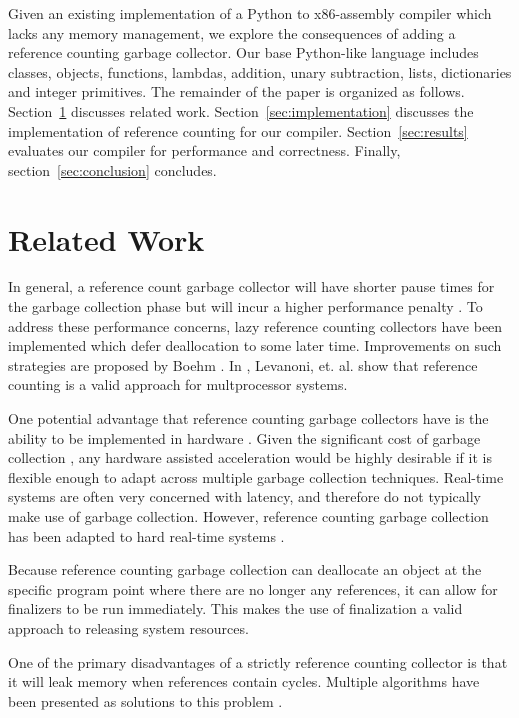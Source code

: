 \documentclass{sigplanconf}
\begin{document}
Given an existing implementation of a Python to x86-assembly compiler which lacks any memory management, we explore the consequences of adding a reference counting garbage collector.  Our base Python-like language includes classes, objects, functions, lambdas, addition, unary subtraction, lists, dictionaries and integer primitives.  The remainder of the paper is organized as follows.  Section~\ref{sec:related} discusses related work.  Section~\ref{sec:implementation} discusses the implementation of reference counting for our compiler.  Section~\ref{sec:results} evaluates our compiler for performance and correctness.  Finally, section~\ref{sec:conclusion} concludes.


\section{Related Work}
\label{sec:related}
In general, a reference count garbage collector will have shorter pause times for the garbage collection phase but will incur a higher performance penalty \cite{joisha}\cite{blackburn}.  To address these performance concerns, lazy reference counting collectors have been implemented which defer deallocation to some later time.  Improvements on such strategies are proposed by Boehm \cite{boehm}. In \cite{levanoni}, Levanoni, et. al. show that reference counting is a valid approach for multprocessor systems. 

One potential advantage that reference counting garbage collectors have is the ability to be implemented in hardware \cite{joao}.  Given the significant cost of garbage collection \cite{hertz}, any hardware assisted acceleration would be highly desirable if it is flexible enough to adapt across multiple garbage collection techniques.  Real-time systems are often very concerned with latency, and therefore do not typically make use of garbage collection.  However, reference counting garbage collection has been adapted to hard real-time systems \cite{ritzaou}. 

Because reference counting garbage collection can deallocate an object at the specific program point where there are no longer any references, it can allow for finalizers to be run immediately.  This makes the use of finalization a valid approach to releasing system resources.   

One of the primary disadvantages of a strictly reference counting collector is that it will leak memory when references contain cycles.  Multiple algorithms have been presented as solutions to this problem \cite{lin}\cite{trancon}.
\end{document}
